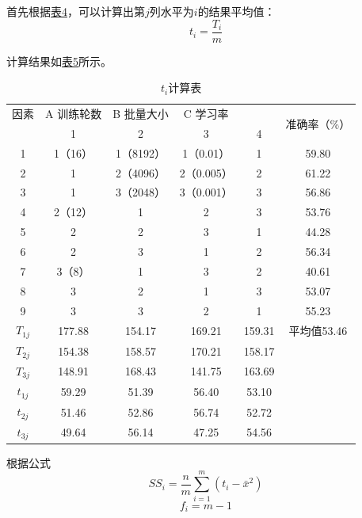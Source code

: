 \documentclass[UTF8]{ctexart}
\begin{document}
	首先根据\hyperref[Chart.4]{表4}，可以计算出第$j$列水平为$i$的结果平均值：
	\begin{equation*}
	t_i = \frac{T_i}{m}
	\end{equation*}
	
	计算结果如\hyperref[Chart.5]{表5}所示。
	
	\begin{table}[htbp]
		\centering
		\caption{$t_i$计算表}
		\begin{tabular}{|c|c|c|c|c|c|}
			\hline
			因素 & A 训练轮数 & B 批量大小 & C 学习率 &   & \multirow{2}[4]{*}{准确率（\%）} \\
			\cline{1-5} \diagbox{实验号}{列号} & 1 & 2 & 3 & 4 &  \\\hline
			1 & 1（16） & 1（8192） & 1（0.01） & 1 & 59.80 \\\hline
			2 & 1 & 2（4096） & 2（0.005） & 2 & 61.22 \\\hline
			3 & 1 & 3（2048） & 3（0.001） & 3 & 56.86 \\\hline
			4 & 2（12） & 1 & 2 & 3 & 53.76 \\\hline
			5 & 2 & 2 & 3 & 1 & 44.28 \\\hline
			6 & 2 & 3 & 1 & 2 & 56.34 \\\hline
			7 & 3（8） & 1 & 3 & 2 & 40.61 \\\hline
			8 & 3 & 2 & 1 & 3 & 53.07 \\\hline
			9 & 3 & 3 & 2 & 1 & 55.23 \\\hline
			$T_{1j}$ & 177.88 & 154.17 & 169.21 & 159.31 & 平均值53.46\\\hline
			$T_{2j}$ & 154.38 & 158.57 & 170.21 & 158.17 & \\\hline
			$T_{3j}$ & 148.91 & 168.43 & 141.75 & 163.69 & \\\hline
			$t_{1j}$ & 59.29 & 51.39 & 56.40 & 53.10 & \\\hline
			$t_{2j}$ & 51.46 & 52.86 & 56.74 & 52.72 & \\\hline
			$t_{3j}$ & 49.64 & 56.14 & 47.25 & 54.56 & \\\hline
			
		\end{tabular}%
		\label{Chart.5}%
	\end{table}%
	
	根据公式
	\begin{equation*}
	SS_i = \frac{n}{m}\sum _{i=1}^{m}(t_i - \bar{x}^2)
	\end{equation*}
	\begin{equation*}
	f_i = m - 1
	\end{equation*}
	
\end{document}
